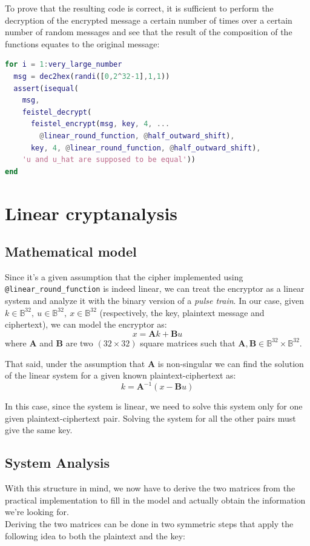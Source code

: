 \documentclass[a4paper,12pt,titlepage]{article}
\begin{document}
To prove that the resulting code is correct, it is sufficient to perform the
decryption of the encrypted message a certain number of times over a certain
number of random messages and see that the result of the composition of the
functions equates to the original message:

\begin{lstlisting}[language=Matlab]
for i = 1:very_large_number
  msg = dec2hex(randi([0,2^32-1],1,1))
  assert(isequal(
    msg,
    feistel_decrypt(
      feistel_encrypt(msg, key, 4, ...
        @linear_round_function, @half_outward_shift), 
      key, 4, @linear_round_function, @half_outward_shift),
    'u and u_hat are supposed to be equal'))
end
\end{lstlisting}

\section{Linear cryptanalysis}
\subsection*{Mathematical model}
Since it's a given assumption that the cipher implemented using
\texttt{@linear\_round\_function} is indeed linear, we can treat the encryptor as a
linear system and analyze it with the binary version of a \emph{pulse train}. In our
case, given 
$k \in \mathbb{B}^{32},\: u \in \mathbb{B}^{32},\: x \in \mathbb{B}^{32}$
(respectively, the key, plaintext message and
ciphertext), we can model the encryptor as:
\[x = \mathbf{A}k + \mathbf{B}u \] 
where $\mathbf{A}$ and $\mathbf{B}$ are two $(32 \times 32)$
square matrices such that $\mathbf{A},\mathbf{B} \in \mathbb{B}^{32} \times \mathbb{B}^{32}$.

That said, under the assumption that $\mathbf{A}$ is non-singular we
can find the solution of the linear system for a given known
plaintext-ciphertext as:
\[k = \mathbf{A}^{-1}(x - \mathbf{B}u)\]

In this case, since the system is linear, we need to solve this system only for
one given plaintext-ciphertext pair. Solving the system for all the other pairs
must give the same key.

\subsection*{System Analysis}
With this structure in mind, we now have to derive the two matrices from the
practical implementation to fill in the model and actually obtain the
information we're looking for. \\
Deriving the two matrices can be done in two symmetric steps that apply the
following idea to both the plaintext and the key:
\end{document}
